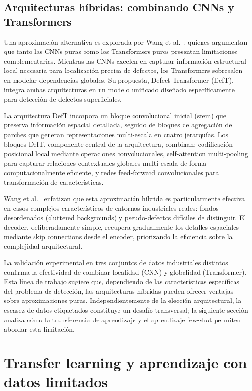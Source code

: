 \subsection{Arquitecturas híbridas: combinando CNNs y Transformers}

Una aproximación alternativa es explorada por Wang et al.~\cite{wang2022defect}, quienes argumentan que tanto las CNNs puras como los Transformers puros presentan limitaciones complementarias. Mientras las CNNs excelen en capturar información estructural local necesaria para localización precisa de defectos, los Transformers sobresalen en modelar dependencias globales. Su propuesta, Defect Transformer (DefT), integra ambas arquitecturas en un modelo unificado diseñado específicamente para detección de defectos superficiales.

La arquitectura DefT incorpora un bloque convolucional inicial (stem) que preserva información espacial detallada, seguido de bloques de agregación de parches que generan representaciones multi-escala en cuatro jerarquías. Los bloques DefT, componente central de la arquitectura, combinan: codificación posicional local mediante operaciones convolucionales, self-attention multi-pooling para capturar relaciones contextuales globales multi-escala de forma computacionalmente eficiente, y redes feed-forward convolucionales para transformación de características.

Wang et al.~\cite{wang2022defect} enfatizan que esta aproximación híbrida es particularmente efectiva en casos complejos característicos de entornos industriales reales: fondos desordenados (cluttered backgrounds) y pseudo-defectos difíciles de distinguir. El decoder, deliberadamente simple, recupera gradualmente los detalles espaciales mediante skip connections desde el encoder, priorizando la eficiencia sobre la complejidad arquitectural.

La validación experimental en tres conjuntos de datos industriales distintos confirma la efectividad de combinar localidad (CNN) y globalidad (Transformer). Esta línea de trabajo sugiere que, dependiendo de las características específicas del problema de detección, las arquitecturas híbridas pueden ofrecer ventajas sobre aproximaciones puras. Independientemente de la elección arquitectural, la escasez de datos etiquetados constituye un desafío transversal; la siguiente sección analiza cómo la transferencia de aprendizaje y el aprendizaje few-shot permiten abordar esta limitación.

\section{Transfer learning y aprendizaje con datos limitados}

